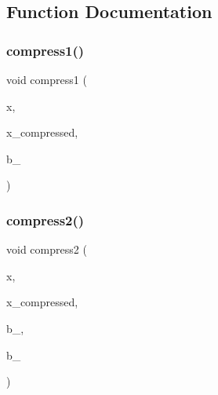 \subsection{Function Documentation}
\mbox{\label{hamming_8_c_a356787ba08a6c14f9a76b3a4222d18fc}} 
\subsubsection{\texorpdfstring{compress1()}{compress1()}}
{\footnotesize\ttfamily void compress1 (\begin{DoxyParamCaption}\item[{\mbox{\hyperlink{galois_8h_a09fddde158a3a20bd2dcadb609de11dc}{I\+NT}} $\ast$}]{x,  }\item[{\mbox{\hyperlink{galois_8h_a09fddde158a3a20bd2dcadb609de11dc}{I\+NT}} $\ast$}]{x\+\_\+compressed,  }\item[{\mbox{\hyperlink{galois_8h_a09fddde158a3a20bd2dcadb609de11dc}{I\+NT}}}]{b\+\_ }\end{DoxyParamCaption})}

\mbox{\label{hamming_8_c_ab11cc7b9f199077fcc8321fa36083646}} 
\subsubsection{\texorpdfstring{compress2()}{compress2()}}
{\footnotesize\ttfamily void compress2 (\begin{DoxyParamCaption}\item[{\mbox{\hyperlink{galois_8h_a09fddde158a3a20bd2dcadb609de11dc}{I\+NT}} $\ast$}]{x,  }\item[{\mbox{\hyperlink{galois_8h_a09fddde158a3a20bd2dcadb609de11dc}{I\+NT}} $\ast$}]{x\+\_\+compressed,  }\item[{\mbox{\hyperlink{galois_8h_a09fddde158a3a20bd2dcadb609de11dc}{I\+NT}}}]{b\+\_,  }\item[{\mbox{\hyperlink{galois_8h_a09fddde158a3a20bd2dcadb609de11dc}{I\+NT}}}]{b\+\_ }\end{DoxyParamCaption})}

\mbox{\label{hamming_8_c_a54840f3524ad91e49e250772ed32b96f}} 
